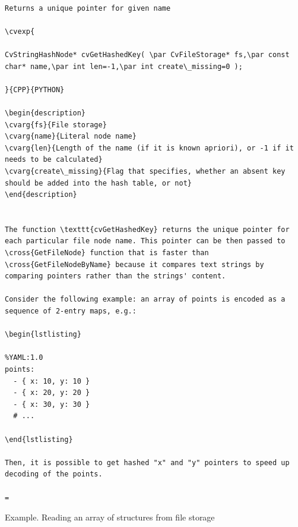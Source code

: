 \begin{verbatim}

Returns a unique pointer for given name

\cvexp{

CvStringHashNode* cvGetHashedKey( \par CvFileStorage* fs,\par const char* name,\par int len=-1,\par int create\_missing=0 );

}{CPP}{PYTHON}

\begin{description}
\cvarg{fs}{File storage}
\cvarg{name}{Literal node name}
\cvarg{len}{Length of the name (if it is known apriori), or -1 if it needs to be calculated}
\cvarg{create\_missing}{Flag that specifies, whether an absent key should be added into the hash table, or not}
\end{description}


The function \texttt{cvGetHashedKey} returns the unique pointer for each particular file node name. This pointer can be then passed to \cross{GetFileNode} function that is faster than \cross{GetFileNodeByName} because it compares text strings by comparing pointers rather than the strings' content.

Consider the following example: an array of points is encoded as a sequence of 2-entry maps, e.g.:

\begin{lstlisting}

%YAML:1.0
points:
  - { x: 10, y: 10 }
  - { x: 20, y: 20 }
  - { x: 30, y: 30 }
  # ...

\end{lstlisting}

Then, it is possible to get hashed "x" and "y" pointers to speed up decoding of the points.

=\end{verbatim}
Example. Reading an array of structures from file storage
